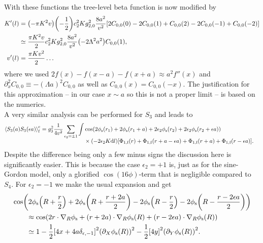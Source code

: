 \documentclass[english, parskip=full]{scrartcl}
\begin{document}
\\
With these functions the tree-level beta function is now modified by
\begin{align}
K'(l) &= \kla*{-\pi K^2 v} \kla*{-\frac{1}{2}} c_2^2 K g_{2,0}^2 \frac{8a^2}{v^2} \klb*{2C_{0,0}(0) - 2C_{0,0}(1) + C_{0,0}(2) - 2C_{0,0}(-1) + C_{0,0}(-2)}\\
&\simeq \frac{\pi K^2 v}{2} c_2^2 Kg_{2,0}^2 \frac{8a^2}{v^2} \kla*{-2\Lambda^2a^2} C_{0,0}(1),\\
v'(l) &= \frac{\pi Kv^2}{2} \dots
\end{align}
where we used $2f(x) - f(x-a) - f(x+a) \approx a^2 f''(x)$ and $\partial_x^2 C_{0,0} \equiv -(\Lambda a)^2 C_{0,0}$ as well as $C_{0,0}(x) = C_{0,0}(-x)$.
The justification for this approximation -- in our case $x\sim a$ so this is not a proper limit -- is based on the numerics.\\
A very similar analysis can be performed for $S_3$ and leads to
\begin{align}
\bra*{S_3(a) S_3(\epsilon a)}_\f^\c &= g_3^2 \frac{1}{4v^2} \sum_{\epsilon_2=\pm 1} \bsplit{\int  &\cos\kla*{2\phi_\s(r_1) + 2\phi_\s(r_1+a) + 2\epsilon_2\phi_\s(r_2) + 2\epsilon_2\phi_\s(r_2+\epsilon a)}\\
&\times (-2 \epsilon_2 K\d l) \klb*{\Phi_{1,\f}(r) + \Phi_{1,\f}(r+a-\epsilon a) + \Phi_{1,\f}(r+a) + \Phi_{1,\f}(r-\epsilon a)}.}
\end{align}
Despite the difference being only a few minus signs the discussion here is significantly easier.
This is because the case $\epsilon_2=+1$ is, just as for the sine-Gordon model, only a glorified $\cos(16\phi)$-term that is negligible compared to $S_4$.
For $\epsilon_2=-1$ we make the usual expansion and get
\begin{align}
&\cos\kla*{2\phi_\s \kla*{R + \frac{r}{2}} + 2\phi_\s\kla*{R + \frac{r+2a}{2}} - 2\phi_\s\kla*{R - \frac{r}{2}} - 2\phi_\s\kla*{R - \frac{r - 2\epsilon a}{2}}} \\
&\qquad \approx \cos\kla*{2r\cdot \nabla_R\phi_\s + \kla*{r+2a}\cdot \nabla_R \phi_\s(R) + \kla*{r - 2\epsilon a}\cdot \nabla_R \phi_\s(R)}\\
&\qquad \simeq 1 - \frac{1}{2} \klb*{4x + 4a\delta_{\epsilon,-1}}^2 \kla*{\partial_X\phi_\s(R)}^2 - \frac{1}{2} \klb*{4y}^2 \kla*{\partial_Y\phi_\s(R)}^2.
\end{align}
\end{document}
